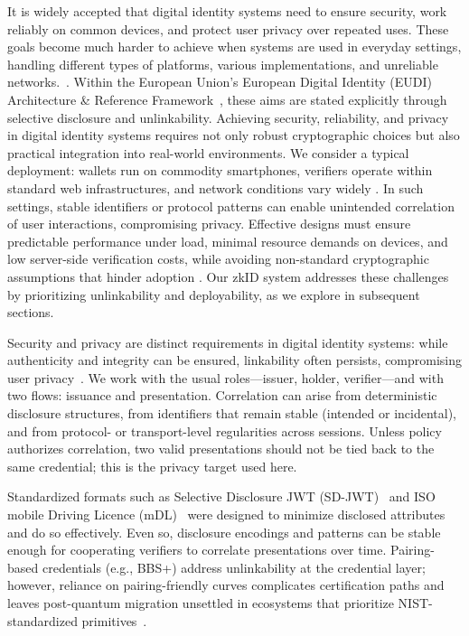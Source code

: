 
It is widely accepted that digital identity systems need to ensure security, work reliably on common devices, and protect user privacy over repeated uses. These goals become much harder to achieve when systems are used in everyday settings, handling different types of platforms, various implementations, and unreliable networks.~\cite{PoPETS:KruPaiRujKan24}. Within the European Union’s European Digital Identity (EUDI) Architecture \& Reference Framework~\cite{EU:EUDI23}, these aims are stated explicitly through selective disclosure and unlinkability. Achieving security, reliability, and privacy in digital identity systems requires not only robust cryptographic choices but also practical integration into real-world environments. We consider a typical deployment: wallets run on commodity smartphones, verifiers operate within standard web infrastructures, and network conditions vary widely \cite{EU:EUDI23}. In such settings, stable identifiers or protocol patterns can enable unintended correlation of user interactions, compromising privacy. Effective designs must ensure predictable performance under load, minimal resource demands on devices, and low server-side verification costs, while avoiding non-standard cryptographic assumptions that hinder adoption \cite{NIST:Grassi17}. Our zkID system addresses these challenges by prioritizing unlinkability and deployability, as we explore in subsequent sections.

Security and privacy are distinct requirements in digital identity systems: while authenticity and integrity can be ensured, linkability often persists, compromising user privacy~\cite{PoPETS:KruPaiRujKan24,JC:FeiFiaSha88}. We work with the usual roles—issuer, holder, verifier—and with two flows: issuance and presentation. Correlation can arise from deterministic disclosure structures, from identifiers that remain stable (intended or incidental), and from protocol- or transport-level regularities across sessions. Unless policy authorizes correlation, two valid presentations should not be tied back to the same credential; this is the privacy target used here.

Standardized formats such as Selective Disclosure JWT (SD-JWT)~ \cite{IETF:FetYasCam25} and ISO mobile Driving Licence (mDL)~\cite{ISO:18013-5} were designed to minimize disclosed attributes and do so effectively. Even so, disclosure encodings and patterns can be stable enough for cooperating verifiers to correlate presentations over time. Pairing-based credentials (e.g., BBS+\cite{C:BCTV14}) address unlinkability at the credential layer; however, reliance on pairing-friendly curves complicates certification paths and leaves post-quantum migration unsettled in ecosystems that prioritize NIST-standardized primitives~\cite{EC:TesZhu23b}.

